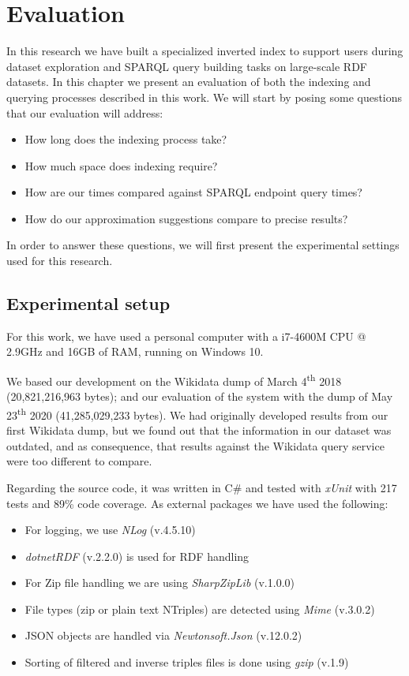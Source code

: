 \chapter{Evaluation}
\label{chap:evaluation}

In this research we have built a specialized inverted index to support users during dataset exploration and SPARQL query building tasks on large-scale RDF datasets. In this chapter we present an evaluation of both the indexing and querying processes described in this work. We will start by posing some questions that our evaluation will address:

\begin{itemize}
    \item How long does the indexing process take?
    \item How much space does indexing require?
    \item How are our times compared against SPARQL endpoint query times?
    \item How do our approximation suggestions compare to precise results?
\end{itemize}

In order to answer these questions, we will first present the experimental settings used for this research.

\section{Experimental setup}

For this work, we have used a personal computer with a i7-4600M CPU @ 2.9GHz and 16GB of RAM, running on Windows 10.

We based our development on the Wikidata dump of March 4\textsuperscript{th} 2018 (20,821,216,963 bytes); and our evaluation of the system with the dump of May 23\textsuperscript{th} 2020 (41,285,029,233 bytes). We had originally developed results from our first Wikidata dump, but we found out that the information in our dataset was outdated, and as consequence, that results against the Wikidata query service were too different to compare.

Regarding the source code, it was written in C\# and tested with \textit{xUnit} with 217 tests and 89\% code coverage. As external packages we have used the following:
\begin{itemize}
    \item For logging, we use \textit{NLog} (v.4.5.10)
    \item \textit{dotnetRDF} (v.2.2.0) is used for RDF handling
    \item For Zip file handling we are using \textit{SharpZipLib} (v.1.0.0)
    \item File types (zip or plain text NTriples) are detected using \textit{Mime} (v.3.0.2)
    \item JSON objects are handled via \textit{Newtonsoft.Json} (v.12.0.2)
    \item Sorting of filtered and inverse triples files is done using \textit{gzip} (v.1.9)
\end{itemize}

